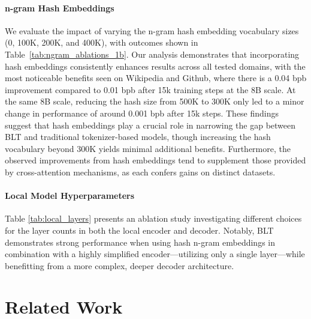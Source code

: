 \paragraph{n-gram Hash Embeddings} 

We evaluate the impact of varying the n-gram hash embedding vocabulary sizes (0, 100K, 200K, and 400K), with outcomes shown in Table~\ref{tab:ngram_ablations_1b}. Our analysis demonstrates that incorporating hash embeddings consistently enhances results across all tested domains, with the most noticeable benefits seen on Wikipedia and Github, where there is a 0.04 bpb improvement compared to 0.01 bpb after 15k training steps at the 8B scale. At the same 8B scale, reducing the hash size from 500K to 300K only led to a minor change in performance of around 0.001 bpb after 15k steps. These findings suggest that hash embeddings play a crucial role in narrowing the gap between {\textsc BLT} and traditional tokenizer-based models, though increasing the hash vocabulary beyond 300K yields minimal additional benefits. Furthermore, the observed improvements from hash embeddings tend to supplement those provided by cross-attention mechanisms, as each confers gains on distinct datasets.

\paragraph{Local Model Hyperparameters} Table \ref{tab:local_layers} presents an ablation study investigating different choices for the layer counts in both the local encoder and decoder. Notably, {\textsc BLT} demonstrates strong performance when using hash n-gram embeddings in combination with a highly simplified encoder—utilizing only a single layer—while benefitting from a more complex, deeper decoder architecture.

\section{Related Work}
\label{section:related_work}

